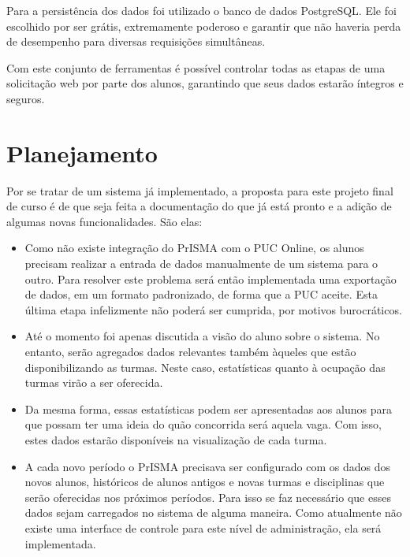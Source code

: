 \documentclass[graduacao,brazil]{ThesisPUC}
\begin{document}
Para a persistência dos dados foi utilizado o banco de dados PostgreSQL. Ele foi escolhido por ser grátis, extremamente poderoso e garantir que não haveria perda de desempenho para diversas requisições simultâneas.

Com este conjunto de ferramentas é possível controlar todas as etapas de uma solicitação web por parte dos alunos, garantindo que seus dados estarão íntegros e seguros.


\chapter{Planejamento}

Por se tratar de um sistema já implementado, a proposta para este projeto final de curso é de que seja feita a documentação do que já está pronto e a adição de algumas novas funcionalidades. São elas:

\begin{itemize}

  \item Como não existe integração do PrISMA com o PUC Online, os alunos precisam realizar a entrada de dados manualmente de um sistema para o outro. Para resolver este problema será então implementada uma exportação de dados, em um formato padronizado, de forma que a PUC aceite. Esta última etapa infelizmente não poderá ser cumprida, por motivos burocráticos.

  \item Até o momento foi apenas discutida a visão do aluno sobre o sistema. No entanto, serão agregados dados relevantes também àqueles que estão disponibilizando as turmas. Neste caso, estatísticas quanto à ocupação das turmas virão a ser oferecida.

  \item Da mesma forma, essas estatísticas podem ser apresentadas aos alunos para que possam ter uma ideia do quão concorrida será aquela vaga. Com isso, estes dados estarão disponíveis na visualização de cada turma.

  \item A cada novo período o PrISMA precisava ser configurado com os dados dos novos alunos, históricos de alunos antigos e novas turmas e disciplinas que serão oferecidas nos próximos períodos. Para isso se faz necessário que esses dados sejam carregados no sistema de alguma maneira. Como atualmente não existe uma interface de controle para este nível de administração, ela será implementada.
\end{itemize}
\end{document}
